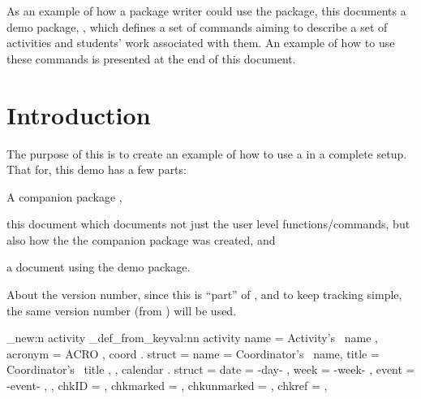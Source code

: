 \documentclass[10pt]{article}
\begin{document}
 
 
\begin{tsabstract}
  As an example of how a package writer could use the  package, this documents a demo package, , which defines a set of commands aiming to describe a set of activities and students' work associated with them. An example of how to use these commands is presented at the end of this document.
\end{tsabstract}

\tableofcontents

\section{Introduction}
The purpose of this is to create an example of how to use a  in a complete setup. That for, this demo has a few parts:
\begin{enumerate*}
  \item A companion package ,
  \item this document which documents not just the user level functions/commands, but also how the the companion package was created, and
  \item a document using the demo package.
\end{enumerate*}
\begin{tsremark}
  About the version number, since this is ``part'' of , and to keep tracking simple, the same version number (from ) will be used.
\end{tsremark}


\begin{codestore}
\starray_new:n {activity}
\starray_def_from_keyval:nn {activity} {
    name = Activity's~ name ,
    acronym = ACRO ,
    coord . struct =  {
        name = Coordinator's~ name,
        title = Coordinator's~ title ,
      } ,
    calendar . struct = {
        date = {-day-} ,
        week = {-week-} ,
        event = {-event-} ,
      } ,
    chkID = ,        %
    chkmarked = ,    %
    chkunmarked = ,  %
    chkref = ,       %
  }
\end{codestore}
\end{document}
